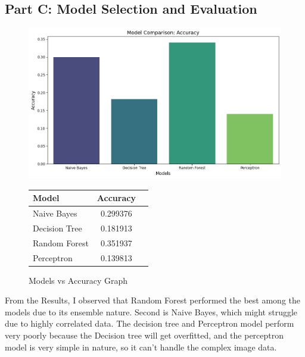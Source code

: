 \documentclass{article}
\begin{document}
\vspace{10pt}
\subsection*{Part C: Model Selection and Evaluation}
\begin{figure}[H]
    \centering
    \begin{minipage}[c]{0.45\linewidth}
        \includegraphics[scale=0.3]{assets/3.png}
        \caption{Models vs Accuracy Graph}
        \label{fig:a}
    \end{minipage}
    \begin{minipage}[c]{0.45\linewidth}
        \centering
        \vspace{0.5cm}
        \begin{tabular}{|l|c|c|}
            \hline
            Model & Accuracy \\ \hline
            Naive Bayes & 0.299376 \\ \hline
            Decision Tree & 0.181913 \\ \hline
            Random Forest & 0.351937 \\ \hline
            Perceptron & 0.139813 \\ \hline
        \end{tabular}
    \end{minipage}
\end{figure}

\hspace{-3pt}
 From the Results, I observed that Random Forest performed the best among the models due to its ensemble nature. Second is Naive Bayes, which might struggle due to highly correlated data. The decision tree and Perceptron model perform very poorly because the Decision tree will get overfitted, and the perceptron model is very simple in nature, so it can't handle the complex image data.
\end{document}
